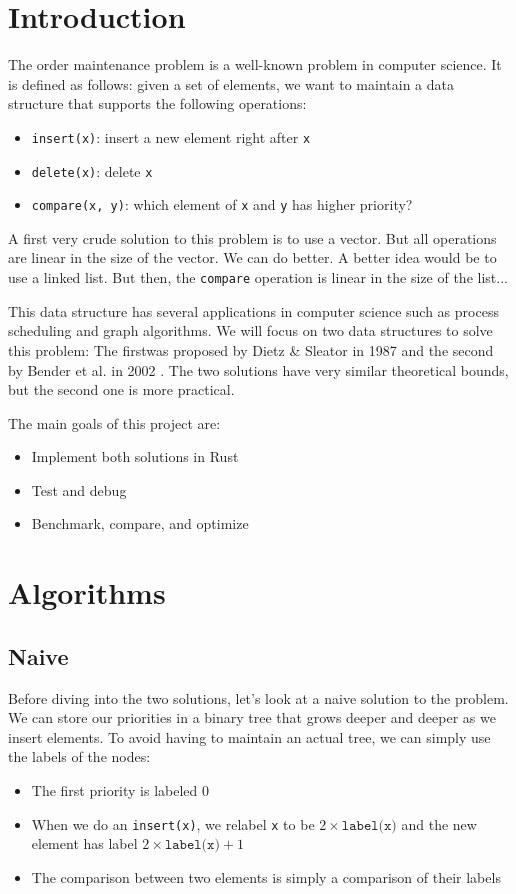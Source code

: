 \documentclass[12pt]{article}
\begin{document}
\newpage
\section{Introduction}

The order maintenance problem is a well-known problem in computer science. It is defined as follows: given a set of elements, we want to maintain a data structure that supports the following operations:
\begin{itemize}
  \item \texttt{insert(x)}: insert a new element right after \texttt{x}
  \item \texttt{delete(x)}: delete \texttt{x}
  \item \texttt{compare(x, y)}: which element of \texttt{x} and \texttt{y} has higher priority?
\end{itemize}

A first very crude solution to this problem is to use a vector. But all operations are linear in the size of the vector. We can do better.
A better idea would be to use a linked list. But then, the \texttt{compare} operation is linear in the size of the list...

This data structure has several applications in computer science such as process scheduling and graph algorithms.
We will focus on two data structures to solve this problem: The firstwas proposed by Dietz \& Sleator in 1987 \cite{10.1145/28395.28434} and the second by Bender et al. in 2002 \cite{10.5555/647912.740822}.
The two solutions have very similar theoretical bounds, but the second one is more practical.

The main goals of this project are:
\begin{itemize}
  \item Implement both solutions in Rust
  \item Test and debug
  \item Benchmark, compare, and optimize
\end{itemize}

\newpage
\section{Algorithms}

\subsection{Naive}

Before diving into the two solutions, let's look at a naive solution to the problem.
We can store our priorities in a binary tree that grows deeper and deeper as we insert elements.
To avoid having to maintain an actual tree, we can simply use the labels of the nodes:
\begin{itemize}
  \item The first priority is labeled 0
  \item When we do an \texttt{insert(x)}, we relabel \texttt{x} to be $2 \times \texttt{label(x)}$ and the new element has label $2 \times \texttt{label(x)} + 1$
  \item The comparison between two elements is simply a comparison of their labels
\end{itemize}
\end{document}
